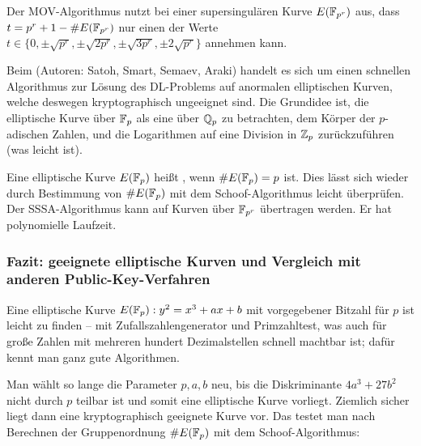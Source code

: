 \begin{bem}
	Der MOV-Algorithmus nutzt bei einer supersingulären Kurve $E(\mathbb{F}_{p^r})$ aus, dass $t = p^r + 1 - \#E(\mathbb{F}_{p^r})$ nur einen der Werte $t \in \{0, \pm \sqrt{p^r}, \pm \sqrt{2p^r}, \pm \sqrt{3p^r}, \pm 2 \sqrt{p^r}\}$ annehmen kann.
\end{bem}

\begin{bem}
	Beim  (Autoren: Satoh, Smart, Semaev, Araki) handelt es sich um einen schnellen Algorithmus zur Lösung des DL-Problems auf anormalen elliptischen Kurven, welche deswegen kryptographisch ungeeignet sind.
	Die Grundidee ist, die elliptische Kurve über $\mathbb{F}_p$ als eine über $\mathbb{Q}_p$ zu betrachten, dem Körper der $p$-adischen Zahlen, und die Logarithmen auf eine Division in $\mathbb{Z}_p$ zurückzuführen (was leicht ist).
\end{bem}

\begin{defn}[anormal]
	Eine elliptische Kurve $E(\mathbb{F}_p)$ heißt , wenn $\#E(\mathbb{F}_p) = p$ ist.
	Dies lässt sich wieder durch Bestimmung von $\#E(\mathbb{F}_p)$ mit dem Schoof-Algorithmus leicht überprüfen.
	Der SSSA-Algorithmus kann auf Kurven über $\mathbb{F}_{p^r}$ übertragen werden.
	Er hat polynomielle Laufzeit.
\end{defn}

\subsubsection{Fazit: geeignete elliptische Kurven und Vergleich mit anderen Public-Key-Verfahren}
\begin{bem}
	Eine elliptische Kurve $E(\mathbb{F}_{p}): y^2 = x^3 + ax + b$ mit vorgegebener Bitzahl für $p$ ist leicht zu finden -- mit Zufallszahlengenerator und Primzahltest, was auch für große Zahlen mit mehreren hundert Dezimalstellen schnell machtbar ist; dafür kennt man ganz gute Algorithmen.
\end{bem}

\begin{bem}
	Man wählt so lange die Parameter $p,a,b$ neu, bis die Diskriminante $4a^3+27b^2$ nicht durch $p$ teilbar ist und somit eine elliptische Kurve vorliegt.
	Ziemlich sicher liegt dann eine kryptographisch geeignete Kurve vor.
	Das testet man nach Berechnen der Gruppenordnung $\#E(\mathbb{F}_p)$ mit dem Schoof-Algorithmus:
\end{bem}

